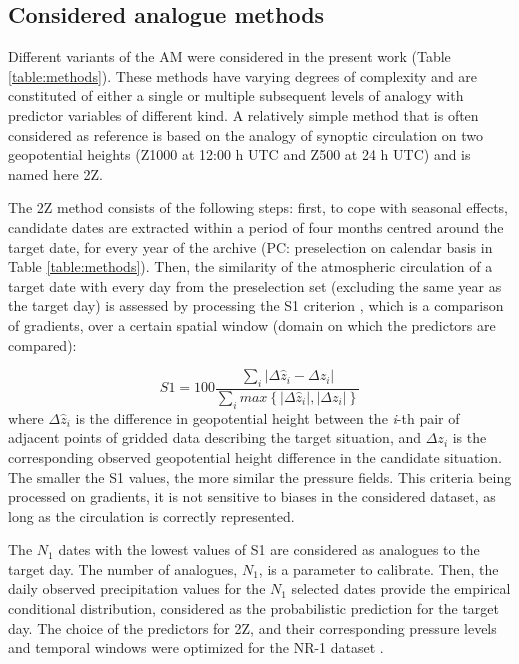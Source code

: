 \documentclass{ametsoc}
\begin{document}
\subsection{Considered analogue methods}
\label{sec:ams}

Different variants of the AM were considered in the present work (Table \ref{table:methods}). These methods have varying degrees of complexity and are constituted of either a single or multiple subsequent levels of analogy with predictor variables of different kind. A relatively simple method that is often considered as reference is based on the analogy of synoptic circulation on two geopotential heights (Z1000 at 12:00 h UTC and Z500 at 24 h UTC) and is named here 2Z.

The 2Z method consists of the following steps: first, to cope with seasonal effects, candidate dates are extracted within a period of four months centred around the target date, for every year of the archive (PC: preselection on calendar basis in Table \ref{table:methods}). Then, the similarity of the atmospheric circulation of a target date with every day from the preselection set (excluding the same year as the target day) is assessed by processing the S1 criterion \citep[Eq.\ \ref{eq:S1}, ][]{Teweles1954, Drosdowsky2003}, which is a comparison of gradients, over a certain spatial window (domain on which the predictors are compared):

\begin{equation}
\label{eq:S1}
S1=100 \frac {\displaystyle \sum_{i} \vert \Delta\hat{z}_{i} - \Delta z_{i} \vert}
{\displaystyle \sum_{i} max\left\lbrace \vert \Delta\hat{z}_{i} \vert , \vert \Delta z_{i} \vert \right\rbrace }
\end{equation}
where $\Delta \hat{z}_{i}$ is the difference in geopotential height between the \textit{i}-th pair of adjacent points of gridded data describing the target situation, and $\Delta z_{i}$ is the corresponding observed geopotential height difference in the candidate situation. The smaller the S1 values, the more similar the pressure fields. This criteria being processed on gradients, it is not sensitive to biases in the considered dataset, as long as the circulation is correctly represented.

The $N_{1}$ dates with the lowest values of S1 are considered as analogues to the target day. The number of analogues, $N_{1}$, is a parameter to calibrate. Then, the daily observed precipitation values for the $N_{1}$ selected dates provide the empirical conditional distribution, considered as the probabilistic prediction for the target day. The choice of the predictors for 2Z, and their corresponding pressure levels and temporal windows were optimized for the NR-1 dataset \citep{Bontron2004}.
\end{document}
